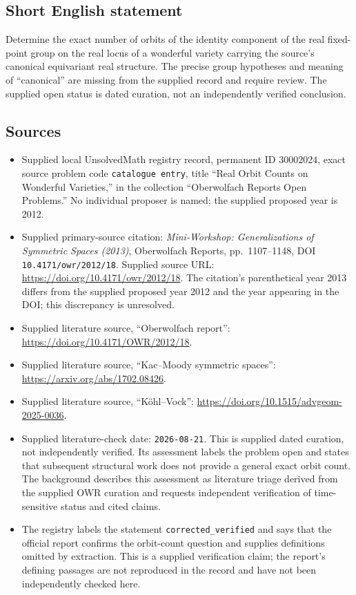 \documentclass[11pt]{article}
\begin{document}
\subsection{Short English statement}
Determine the exact number of orbits of the identity component of the real fixed-point group on the real locus of a wonderful variety carrying the source's canonical equivariant real structure. The precise group hypotheses and meaning of ``canonical'' are missing from the supplied record and require review. The supplied open status is dated curation, not an independently verified conclusion.
\subsection{Sources}
\begin{itemize}
\item Supplied local UnsolvedMath registry record, permanent ID \(30002024\), exact source problem code \texttt{catalogue entry}, title ``Real Orbit Counts on Wonderful Varieties,'' in the collection ``Oberwolfach Reports Open Problems.'' No individual proposer is named; the supplied proposed year is 2012.
\item Supplied primary-source citation: \emph{Mini-Workshop: Generalizations of Symmetric Spaces (2013)}, Oberwolfach Reports, pp.\ 1107--1148, DOI \texttt{10.4171/owr/2012/18}. Supplied source URL: \url{https://doi.org/10.4171/owr/2012/18}. The citation's parenthetical year 2013 differs from the supplied proposed year 2012 and the year appearing in the DOI; this discrepancy is unresolved.
\item Supplied literature source, ``Oberwolfach report'': \url{https://doi.org/10.4171/OWR/2012/18}.
\item Supplied literature source, ``Kac--Moody symmetric spaces'': \url{https://arxiv.org/abs/1702.08426}.
\item Supplied literature source, ``Köhl--Vock'': \url{https://doi.org/10.1515/advgeom-2025-0036}.
\item Supplied literature-check date: \texttt{2026-08-21}. This is supplied dated curation, not independently verified. Its assessment labels the problem open and states that subsequent structural work does not provide a general exact orbit count. The background describes this assessment as literature triage derived from the supplied OWR curation and requests independent verification of time-sensitive status and cited claims.
\item The registry labels the statement \texttt{corrected\_verified} and says that the official report confirms the orbit-count question and supplies definitions omitted by extraction. This is a supplied verification claim; the report's defining passages are not reproduced in the record and have not been independently checked here.
\end{itemize}
\end{document}
